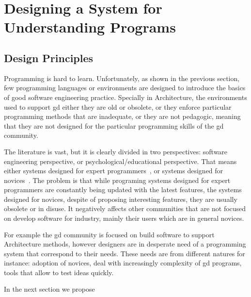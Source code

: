 
\iffalse  \fi

\chapter{Designing a System for Understanding Programs}
\label{chapter:pegd}

\section{Design Principles} 

Programming is hard to learn. Unfortunately, as shown in the previous section, few programming languages or environments are designed to introduce the basics of good software engineering practice. Specially in Architecture, the environments used to support \gls{gd} either they are old or obsolete, or they enforce particular programming methods that are inadequate, or they are not pedagogic, meaning that they are not designed for the particular programming skills of the \gls{gd} community.

The literature is vast, but it is clearly divided in two perspectives: software engineering perspective, or psychological/educational perspective. That means either systems designed for expert programmers~\cite{carlson2005eclipse,intellij2001intellij,lighttable,boudreau2002netbeans,guckenheimer2006software}, or systems designed for novices~\cite{papert1980mindstorms,goldberg1983smalltalk,GuoSIGCSE2013,reas2006processing}. The problem is that while programing systems designed for expert programmers are constantly being updated with the latest features, the systems designed for novices, despite of proposing interesting features, they are usually obsolete or in disuse. It negatively affects other communities that are not focused on develop software for industry, mainly their users which are in general novices.

For example the \gls{gd} community is focused on build software to support Architecture methods, however designers are in desperate need of a programming system that correspond to their needs. These needs are from different natures for instance: adoption of novices, deal with increasingly complexity of \gls{gd} programs, tools that allow to test ideas quickly.

In the next section we propose 